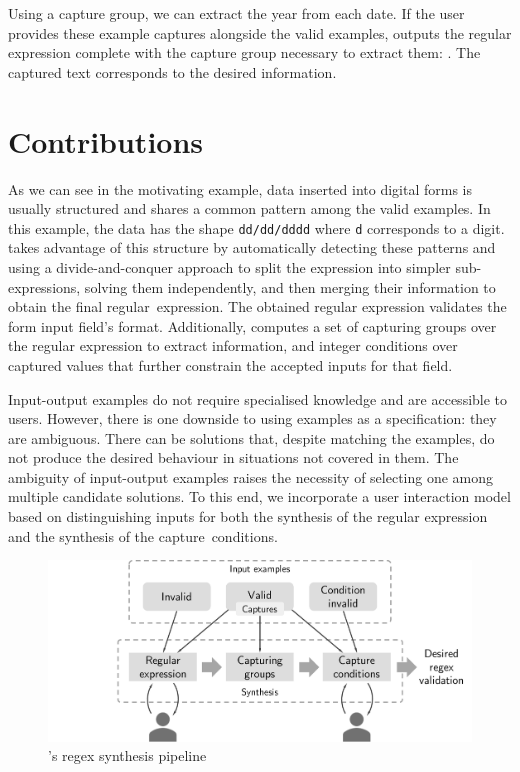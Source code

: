 Using a capture group, we can extract the year from each date. If the user provides these example captures alongside the valid examples, \Forest outputs the regular expression complete with the capture group necessary to extract them: . The captured text corresponds to the desired information.

\section{Contributions}

As we can see in the motivating example, data inserted into digital forms is usually structured and shares a common pattern among the valid examples.
In this example, the data has the shape \texttt{dd/dd/dddd} where \texttt{d} corresponds to a digit. 
\Forest takes advantage of this structure by automatically detecting these patterns and using a divide-and-conquer approach to split the expression into simpler sub-expressions, solving them independently, and then merging their information to obtain the final regular~expression.
The obtained regular expression validates the form input field's format. Additionally, \Forest computes a set of capturing groups over the regular expression to extract information, and integer conditions over captured values that further constrain the accepted inputs for that field.

Input-output examples do not require specialised knowledge and are accessible to users.
However, there is one downside to using examples as a specification: they are ambiguous. There can be solutions that, despite matching the examples, do not produce the desired behaviour in situations not covered in them.
The ambiguity of input-output examples raises the necessity of selecting one among multiple candidate solutions.
%
To this end, we incorporate a user interaction model based on distinguishing inputs
for both the synthesis of the regular expression and the synthesis of the capture~conditions. 

\begin{figure}
    \centering
    \includegraphics[scale=.35]{pictures/regex_synthesis_h.pdf}
    \caption{\Forest's regex synthesis pipeline}
    \label{fig:regex-synthesis}
\end{figure}

